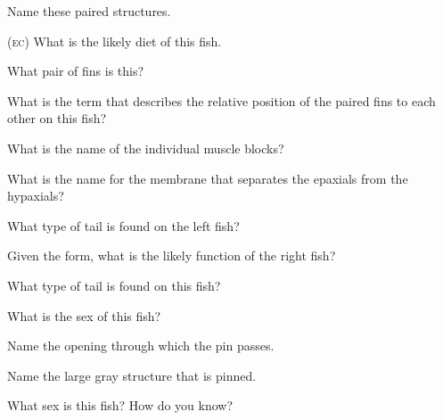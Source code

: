 \documentclass{exam}
\begin{document}
\begin{questions}
{%
\question Name these paired structures.

\bonusquestion \textsc{(ec)} What is the likely diet of this fish.

\vspace{2\baselineskip}


\question What pair of fins is this?

\question What is the term that describes the relative position of the paired fins to each other on this fish?

\vspace{2\baselineskip}


\question What is the name of the individual muscle blocks?

\question What is the name for the membrane that separates the epaxials from the hypaxials?

\vspace{2\baselineskip}

\question What type of tail is found on the left fish? 

\question Given the form, what is the likely function of the right fish? %

\vspace{2\baselineskip}



\question What type of tail is found on this fish?

\question What is the sex of this fish?

\vspace{2\baselineskip}



\question Name the opening through which the pin passes.

\question Name the large gray structure that is pinned.

\question What sex is this fish? How do you know?

\vspace{2\baselineskip}



}
\end{questions}
\end{document}
